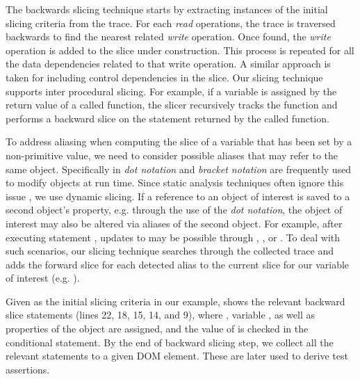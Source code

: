 The backwards slicing technique starts by extracting instances of the initial slicing criteria from the trace. For each \textit{read} operations, the trace is traversed backwards to find the nearest related \textit{write} operation. Once found, the \textit{write} operation is added to the slice under construction. This process is repeated for all the data dependencies related to that write operation. A similar approach is taken for including control dependencies in the slice. 
Our slicing technique supports inter procedural slicing. For example, if a variable is assigned by the return value of a called function, the slicer recursively tracks the function and performs a backward slice on the statement returned by the called function.
  
To address aliasing when computing the slice of a variable that has been set by a non-primitive value, we need to consider possible aliases that may refer to the same object. Specifically in \javascript \textit{dot notation} and \textit{bracket notation} are frequently used to modify objects at run time. Since static analysis techniques often ignore this issue \cite{Feldthaus:icse13}, we use dynamic slicing. If a reference to an object of interest is saved to a second object's property, e.g. through the use of the \textit{dot notation}, the object of interest may also be altered via aliases of the second object. For example, after executing statement , updates to  may be possible through , , or . To deal with such scenarios, our slicing technique searches through the collected trace and adds the forward slice for each detected alias to the current slice for our variable of interest (e.g. ). 

Given  as the initial slicing criteria in our example,  shows the relevant backward slice statements (lines 22, 18, 15, 14, and 9), where ,  variable , as well as properties of the object  are assigned, and the value of  is checked in the conditional statement.
By the end of backward slicing step, we collect all the relevant statements to a given DOM element. These are later used to derive test assertions.    
